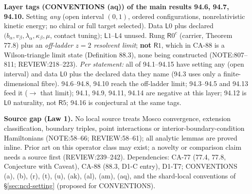 \textbf{Layer tags (CONVENTIONS (aq)) of the main results 94.6, 94.7, 94.10.}  Setting \emph{any} (open interval
\((0,1)\), ordered configurations, nonrelativistic kinetic energy; no chiral or full target selected).  Data \(\mathsf L0\)
plus declared \((b_\alpha,v_\beta,\lambda_\alpha,\kappa_\beta,\mu\), contact tuning\()\); \(\mathsf L1\)--\(\mathsf L4\) unused.  Rung
\(\mathsf R0^{c}\) (carrier, Theorem 77.8) plus an \emph{off-ladder \(z{=}2\) resolvent limit}; \textbf{not} \(\mathsf R1\),
which in CA-88 is a Wilson-triangle limit state (Definition 88.3), none being constructed (NOTE:807--811;
REVIEW:218--223).  \emph{Per statement:} all of 94.1--94.15 have setting any (open interval) and data \(\mathsf L0\) plus the
declared data they name (94.3 uses only a finite-dimensional fibre).  94.6--94.8, 94.10 reach the off-ladder limit; 94.3--94.5 and
94.13 feed it (\(\to\) that limit); 94.1, 94.9, 94.11, 94.14 are negative at this layer; 94.12 is \(\mathsf L0\) naturality, not \(\mathsf R5\);
94.16 is conjectural at the same tags.

\textbf{Source gap (Law 1).}  No local source treats Mosco convergence, extension classification, boundary triples, point
interactions or interior-boundary-condition Hamiltonians (NOTE:58--66; REVIEW:58--61); all analytic lemmas are proved inline.
Prior art on this operator class may exist; a novelty or comparison claim needs a source first (REVIEW:239--242).
Dependencies: CA-77 (77.4, 77.8, Conjecture with Caveat), CA-88 (88.3, D1-C entry), D1-T7; CONVENTIONS (a), (b), (r), (t), (u),
(ak), (al), (am), (aq), and the shard-local conventions of \S\ref{sec:ncd-setting} (proposed for CONVENTIONS).


